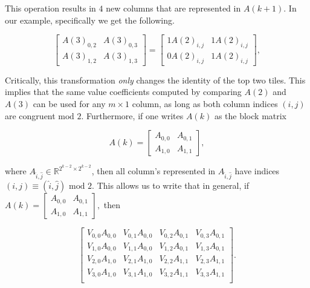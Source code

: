 \documentclass[12pt]{article}
\theoremstyle{plain}
\theoremstyle{definition}
\theoremstyle{remark}
\theoremstyle{definition}
\newcommand{\lablnode}[3]{\node[shape=circle,draw=none,fill=none, inner sep=0pt,minimum size=5pt] (A) at ( #1 , #2 ) {#3};}
\newcommand{\lablvertex}[3]{\node[shape=circle,draw=none,fill=white, inner sep=2pt,minimum size=5pt] (A) at ( #1 , #2 ) {#3};}
\begin{document}
\begin{center}
\end{center}

This operation results in $4$ new columns that are represented in $A(k+1)$. In our example, specifically we get the following. 

$$
\begin{bmatrix} 
    A(3)_{0,2} & A(3)_{0,3} \\ 
    A(3)_{1,2} & A(3)_{1,3} 
\end{bmatrix} = 
\begin{bmatrix} 
    1A(2)_{i,j} & 1A(2)_{i,j} \\ 
    0A(2)_{i,j} & 1A(2)_{i,j} 
\end{bmatrix},
$$

Critically, this transformation \textit{only} changes the identity of the top two tiles. This implies that the same value coefficients computed by comparing $A(2)$ and $A(3)$ can be used for any $m \times 1$ column, as long as both column indices $(i,j)$ are congruent $\text{mod } 2$. Furthermore, if one writes $A(k)$ as the block matrix

$$A(k) = \begin{bmatrix} A_{0,0} & A_{0,1} \\ A_{1,0} & A_{1,1} \end{bmatrix},$$

where $A_{\hat{i},\hat{j}} \in \mathbb{R}^{2^{k-2} \times 2^{k-2}}$, then all column's represented in $A_{\hat{i},\hat{j}}$ have indices $(i,j) \equiv (\hat{i},\hat{j}) \text{ mod } 2$. This allows us to write that in general, if $A(k) = \begin{bmatrix} A_{0,0} & A_{0,1} \\ A_{1,0} & A_{1,1} \end{bmatrix},$
then

\begin{equation}\label{eqn: coefficient matrix prod}
    \begin{bmatrix}
        V_{0,0}A_{0,0} & V_{0,1}A_{0,0} & V_{0,2}A_{0,1} & V_{0,3}A_{0,1} \\
        V_{1,0}A_{0,0} & V_{1,1}A_{0,0} & V_{1,2}A_{0,1} & V_{1,3}A_{0,1} \\
        V_{2,0}A_{1,0} & V_{2,1}A_{1,0} & V_{2,2}A_{1,1} & V_{2,3}A_{1,1} \\
        V_{3,0}A_{1,0} & V_{3,1}A_{1,0} & V_{3,2}A_{1,1} & V_{3,3}A_{1,1} \\
    \end{bmatrix}.
\end{equation}
\end{document}
